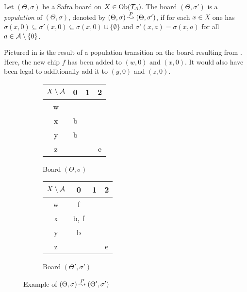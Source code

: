 \begin{definition}\label{def:populate}
  Let $(\Theta, \sigma)$ be a Safra board on $X \in \mathrm{Ob}(\mathcal{T}_{\mathcal{A}})$.
  The board $(\Theta, \sigma')$ is a \emph{population} of
  $(\Theta, \sigma)$, denoted by $(\Theta, \sigma)
  \stackrel{P}{\leadsto} (\Theta, \sigma')$, if for each $x \in X$ one has
  $\sigma(x, 0) \subseteq \sigma'(x, 0) \subseteq \sigma(x, 0) \cup
  \{\emptyset \}$ and $\sigma'(x, a) = \sigma(x, a)$ for all $a \in \mathcal{A}
  \setminus \{0\}$.
\end{definition}

\begin{example}\label{ex:populate}
  Pictured in  is the result of a population transition on
  the board resulting from . Here, the new chip $f$ has been
  added to $(w, 0)$ and $(x, 0)$. It would also have been legal to additionally
  add it to $(y, 0)$ and $(z, 0)$.
  \begin{figure}[h]
    \centering
    
    \begin{subfigure}[b]{0.45\textwidth}
      \centering
      \begin{tabular}{|c|c|c|c|}
        \hline
        $X \setminus \mathcal{A}$& 0 & 1 & 2 \\
        \hline
        w & & & \\
        \hline
        x & b & & \\
        \hline
        y & b & & \\
        \hline
        z & & & e \\
        \hline
      \end{tabular}
      \caption{Board $(\Theta, \sigma)$}
      \label{fig:populate-a}
    \end{subfigure}
    \begin{subfigure}[b]{0.45\textwidth}
      \centering
      \begin{tabular}{|c|c|c|c|}
        \hline
        $X \setminus \mathcal{A}$& 0 & 1 & 2 \\
        \hline
        w & f & & \\
        \hline
        x & b, f & & \\
        \hline
        y & b & & \\
        \hline
        z & & & e \\
        \hline
      \end{tabular}
      \caption{Board $(\Theta', \sigma')$}
      \label{fig:populate-b}
    \end{subfigure}
    \caption{Example of $(\Theta, \sigma) \stackrel{P}{\leadsto} (\Theta', \sigma')$}
    \label{fig:populate}
  \end{figure}
\end{example}

